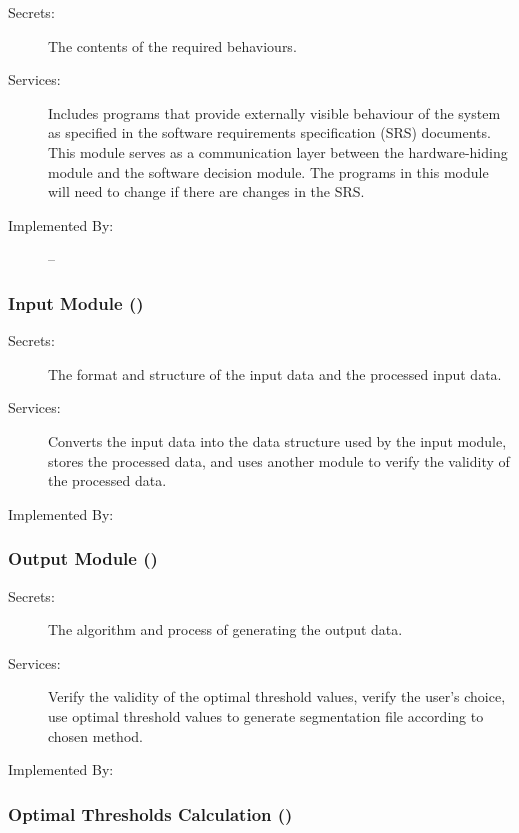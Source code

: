 \documentclass[12pt, titlepage]{article}
\begin{document}
\begin{description}
\item[Secrets:]The contents of the required behaviours.
\item[Services:]Includes programs that provide externally visible behaviour of
  the system as specified in the software requirements specification (SRS)
  documents. This module serves as a communication layer between the
  hardware-hiding module and the software decision module. The programs in this
  module will need to change if there are changes in the SRS.
\item[Implemented By:] --
\end{description}

\subsubsection{Input Module ()}

\begin{description}
\item[Secrets:]The format and structure of the input data and the processed
input data.
\item[Services:]Converts the input data into the data structure used by the
input module, stores the processed data, and uses another module to verify the
validity of the processed data.
\item[Implemented By:] \progname{}
\end{description}

\subsubsection{Output Module ()}

\begin{description}
\item[Secrets:]The algorithm and process of generating the output data.
\item[Services:]Verify the validity of the optimal threshold values, verify the
user's choice, use optimal threshold values to generate segmentation file
according to chosen method.
\item[Implemented By:] \progname{}
\end{description}

\subsubsection{Optimal Thresholds Calculation ()}
\end{document}
